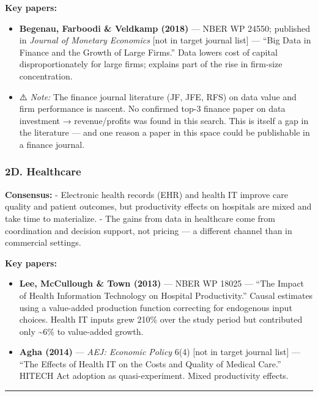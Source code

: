 \documentclass[
]{article}
\providecommand{\tightlist}{%
  \setlength{\itemsep}{0pt}\setlength{\parskip}{0pt}}
\begin{document}
\textbf{Key papers:}

\begin{itemize}
\tightlist
\item
  \textbf{Begenau, Farboodi \& Veldkamp (2018)} --- NBER WP 24550;
  published in \emph{Journal of Monetary Economics} {[}not in target
  journal list{]} --- ``Big Data in Finance and the Growth of Large
  Firms.'' Data lowers cost of capital disproportionately for large
  firms; explains part of the rise in firm-size concentration.
\item
  ⚠️ \emph{Note:} The finance journal literature (JF, JFE, RFS) on data
  value and firm performance is nascent. No confirmed top-3 finance
  paper on data investment → revenue/profits was found in this search.
  This is itself a gap in the literature --- and one reason a paper in
  this space could be publishable in a finance journal.
\end{itemize}

\hypertarget{d.-healthcare}{%
\subsubsection{2D. Healthcare}\label{d.-healthcare}}

\textbf{Consensus:} - Electronic health records (EHR) and health IT
improve care quality and patient outcomes, but productivity effects on
hospitals are mixed and take time to materialize. - The gains from data
in healthcare come from coordination and decision support, not pricing
--- a different channel than in commercial settings.

\textbf{Key papers:}

\begin{itemize}
\tightlist
\item
  \textbf{Lee, McCullough \& Town (2013)} --- NBER WP 18025 --- ``The
  Impact of Health Information Technology on Hospital Productivity.''
  Causal estimates using a value-added production function correcting
  for endogenous input choices. Health IT inputs grew 210\% over the
  study period but contributed only \textasciitilde6\% to value-added
  growth.
\item
  \textbf{Agha (2014)} --- \emph{AEJ: Economic Policy} 6(4) {[}not in
  target journal list{]} --- ``The Effects of Health IT on the Costs and
  Quality of Medical Care.'' HITECH Act adoption as quasi-experiment.
  Mixed productivity effects.
\end{itemize}

\begin{center}\rule{0.5\linewidth}{0.5pt}\end{center}
\end{document}
